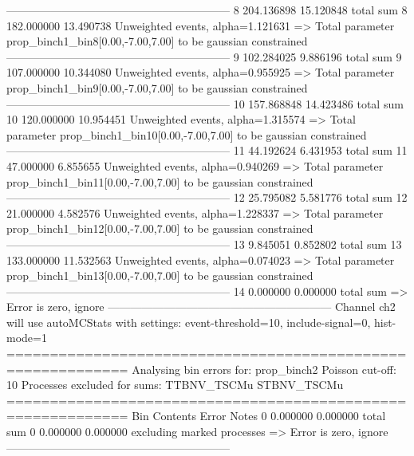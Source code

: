 ------------------------------------------------------------
8          204.136898      15.120848       total sum                     
8          182.000000      13.490738       Unweighted events, alpha=1.121631
  => Total parameter prop_binch1_bin8[0.00,-7.00,7.00] to be gaussian constrained
------------------------------------------------------------
9          102.284025      9.886196        total sum                     
9          107.000000      10.344080       Unweighted events, alpha=0.955925
  => Total parameter prop_binch1_bin9[0.00,-7.00,7.00] to be gaussian constrained
------------------------------------------------------------
10         157.868848      14.423486       total sum                     
10         120.000000      10.954451       Unweighted events, alpha=1.315574
  => Total parameter prop_binch1_bin10[0.00,-7.00,7.00] to be gaussian constrained
------------------------------------------------------------
11         44.192624       6.431953        total sum                     
11         47.000000       6.855655        Unweighted events, alpha=0.940269
  => Total parameter prop_binch1_bin11[0.00,-7.00,7.00] to be gaussian constrained
------------------------------------------------------------
12         25.795082       5.581776        total sum                     
12         21.000000       4.582576        Unweighted events, alpha=1.228337
  => Total parameter prop_binch1_bin12[0.00,-7.00,7.00] to be gaussian constrained
------------------------------------------------------------
13         9.845051        0.852802        total sum                     
13         133.000000      11.532563       Unweighted events, alpha=0.074023
  => Total parameter prop_binch1_bin13[0.00,-7.00,7.00] to be gaussian constrained
------------------------------------------------------------
14         0.000000        0.000000        total sum                     
  => Error is zero, ignore      
------------------------------------------------------------
Channel ch2 will use autoMCStats with settings: event-threshold=10, include-signal=0, hist-mode=1
============================================================
Analysing bin errors for: prop_binch2
Poisson cut-off: 10
Processes excluded for sums: TTBNV_TSCMu STBNV_TSCMu
============================================================
Bin        Contents        Error           Notes                         
0          0.000000        0.000000        total sum                     
0          0.000000        0.000000        excluding marked processes    
  => Error is zero, ignore      
------------------------------------------------------------
